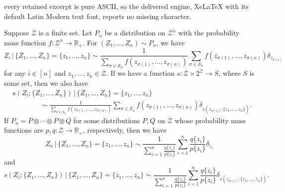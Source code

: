 \documentclass[10pt,a4paper]{amsart}
\newcommand{\R}{\mathbb{R}}
\newcommand{\cS}{\mathcal{S}}
\newcommand{\cZ}{\mathcal{Z}}
\begin{document}
every retained excerpt is pure ASCII, so the delivered engine, XeLaTeX with its default Latin Modern text font, reports no missing character.
\begin{lemma}
    \label{lem:conditional_distribution_permutation}
    Suppose $\cZ$ is a finite set. Let $P_n$ be a distribution on $\cZ^n$ with the probability mass function $f \colon \cZ^n \to \R_+$. For $(Z_1, \ldots, Z_n) \sim P_n$, we have 
    \begin{equation*}
        Z_i \, | \, \{Z_1, \ldots, Z_n\} = \{z_1, \ldots, z_n\} \sim \frac{1}{\sum_{\sigma \in \cS_n} f(z_{\sigma(1)}, \ldots, z_{\sigma(n)})} \sum_{\sigma \in \cS_n} f(z_{\sigma(1)}, \ldots, z_{\sigma(n)}) \delta_{z_{\sigma(i)}}
    \end{equation*}
    for any $i \in [n]$ and $z_1, \ldots, z_n \in \cZ$. If we have a function $s \colon \cZ \times 2^\cZ \to S$, where $S$ is some set, then we also have
    \begin{equation*}
        \begin{split}
            & s(Z_i; \{Z_1, \ldots, Z_n\}) \, | \, \{Z_1, \ldots, Z_n\} = \{z_1, \ldots, z_n\} \\
            & \qquad \qquad \sim \frac{1}{\sum_{\sigma \in \cS_n} f(z_{\sigma(1)}, \ldots, z_{\sigma(n)})} \sum_{\sigma \in \cS_n} f(z_{\sigma(1)}, \ldots, z_{\sigma(n)}) \delta_{s(z_{\sigma(i)}; \{z_1, \ldots, z_n\})}.
        \end{split}
    \end{equation*}
    If $P_n = P \otimes \cdots \otimes P \otimes Q$ for some distributions $P, Q$ on $\cZ$ whose probability mass functions are $p, q \colon \cZ \to \R_+$, respectively, then
     we have 
    \begin{equation*}
        Z_n \, | \, \{Z_1, \ldots, Z_n\} = \{z_1, \ldots, z_n\} \sim \frac{1}{\sum_{i = 1}^{n} \frac{q\{z_i\}}{p\{z_i\}}} \sum_{i = 1}^{n} \frac{q\{z_i\}}{p\{z_i\}} \delta_{z_i}
    \end{equation*}
    and 
    \begin{equation*}
        s(Z_i; \{Z_1, \ldots, Z_n\}) \, | \, \{Z_1, \ldots, Z_n\} = \{z_1, \ldots, z_n\} \sim \frac{1}{\sum_{i = 1}^{n} \frac{q\{z_i\}}{p\{z_i\}}} \sum_{i = 1}^{n} \frac{q\{z_i\}}{p\{z_i\}} \delta_{s(z_{\sigma(i)}; \{z_1, \ldots, z_n\})}.
    \end{equation*}
\end{lemma}
\end{document}
